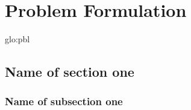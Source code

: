 \chapter{Problem Formulation}

\lipsum[1]

\acrshort{glo:pbl}

\section{Name of section one} \cite{bib:pbl}

\lipsum[2]

\subsection{Name of subsection one}

\lipsum[5]

